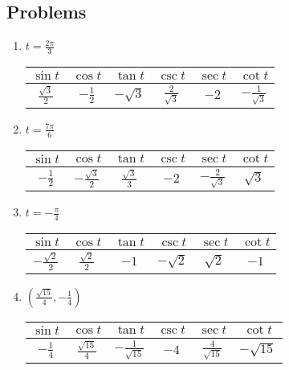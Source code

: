 \documentclass{exam}
\begin{document}
  \subsection{Problems}
  \begin{enumerate}

    \item
      $t = \frac{2 \pi}{3}$

      \begin{tabular}[H]{cccccc}
        \toprule
        $\sin t$             & $\cos t$        & $\tan t$     & $\csc t$             & $\sec t$ & $\cot t$ \\
        \midrule
        $\frac{\sqrt{3}}{2}$ & $- \frac{1}{2}$ & $- \sqrt{3}$ & $\frac{2}{\sqrt{3}}$ & $- 2$    & $- \frac{1}{\sqrt{3}}$ \\
        \bottomrule
      \end{tabular}

    \item
      $t = \frac{7 \pi}{6}$

      \begin{tabular}[H]{cccccc}
        \toprule
        $\sin t$       & $\cos t$               & $\tan t$             & $\csc t$ & $\sec t$               & $\cot t$ \\
        \midrule
        $-\frac{1}{2}$ & $- \frac{\sqrt{3}}{2}$ & $\frac{\sqrt{3}}{3}$ & $-2$     & $- \frac{2}{\sqrt{3}}$ & $\sqrt{3}$ \\
        \bottomrule
      \end{tabular}

    \item
      $t = - \frac{\pi}{4}$

      \begin{tabular}[H]{cccccc}
        \toprule
        $\sin t$               & $\cos t$             & $\tan t$ & $\csc t$    & $\sec t$   & $\cot t$ \\
        \midrule
        $- \frac{\sqrt{2}}{2}$ & $\frac{\sqrt{2}}{2}$ & $-1$     & $-\sqrt{2}$ & $\sqrt{2}$ & $-1$ \\
        \bottomrule
      \end{tabular}

    \item
      $\left( \frac{\sqrt{15}}{4}, - \frac{1}{4} \right)$

      \begin{tabular}[H]{cccccc}
        \toprule
        $\sin t$       & $\cos t$              & $\tan t$               & $\csc t$ & $\sec t$              & $\cot t$ \\
        \midrule
        $-\frac{1}{4}$ & $\frac{\sqrt{15}}{4}$ & $-\frac{1}{\sqrt{15}}$ & $-4$     & $\frac{4}{\sqrt{15}}$ & $-\sqrt{15}$ \\
        \bottomrule
      \end{tabular}


\end{enumerate}
\end{document}
